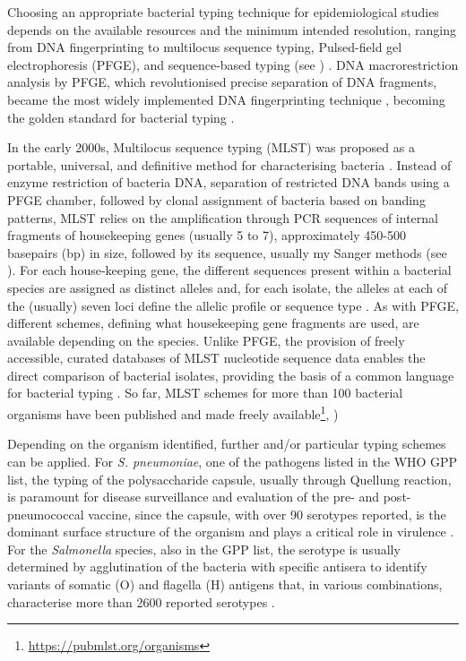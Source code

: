 Choosing an appropriate bacterial typing technique for epidemiological studies depends on the available resources and the minimum intended resolution, ranging from DNA fingerprinting to multilocus sequence typing, Pulsed-field gel electrophoresis (PFGE), and sequence-based typing (see ) \citep{allerberger_molecular_2012,foxman_choosing_2005}. 
DNA macrorestriction analysis by PFGE, which revolutionised precise separation of DNA fragments, became the most widely implemented DNA fingerprinting technique \citep{allerberger_molecular_2012}, becoming the golden standard for bacterial typing \citep{neoh_pulsed-field_2019}.

In the early 2000s, Multilocus sequence typing (MLST) was proposed as a portable, universal, and definitive method for characterising bacteria \citep{maiden_multilocus_2006}. 
Instead of enzyme restriction of bacteria DNA, separation of restricted DNA bands using a PFGE chamber, followed by clonal assignment of bacteria based on banding patterns, MLST relies on the amplification through PCR sequences of internal fragments of housekeeping genes (usually 5 to 7), approximately 450-500 basepairs (bp) in size, followed by its sequence, usually my Sanger methods (see ). 
For each house-keeping gene, the different sequences present within a bacterial species are assigned as distinct alleles and, for each isolate, the alleles at each of the (usually) seven loci define the allelic profile or sequence type \citep{larsen_multilocus_2012}. 
As with PFGE, different schemes, defining what housekeeping gene fragments are used, are available depending on the species. 
Unlike PFGE, the provision of freely accessible, curated databases of MLST nucleotide sequence data enables the direct comparison of bacterial isolates, providing the basis of a common language for bacterial typing \citep{maiden_multilocus_2006}. 
So far, MLST schemes for more than 100 bacterial organisms have been published and made freely available\footnote{\url{https://pubmlst.org/organisms}}, \cite{jolley_open-access_2018}) 

Depending on the organism identified, further and/or particular typing schemes can be applied. 
For \textit{S. pneumoniae}, one of the pathogens listed in the \ac{WHO} \ac{GPP} list, the typing of the polysaccharide capsule, usually through Quellung reaction, is paramount for disease surveillance and evaluation of the pre- and post-pneumococcal vaccine, since the capsule, with over 90 serotypes reported, is the dominant surface structure of the organism and plays a critical role in virulence \citep{jauneikaite_current_2015, paton_streptococcus_2019}. 
For the \textit{Salmonella} species, also in the \ac{GPP} list, the serotype is usually determined by agglutination of the bacteria with specific antisera to identify variants of somatic (O) and flagella (H) antigens that, in various combinations, characterise more than 2600 reported serotypes \citep{diep_salmonella_2019}. 

